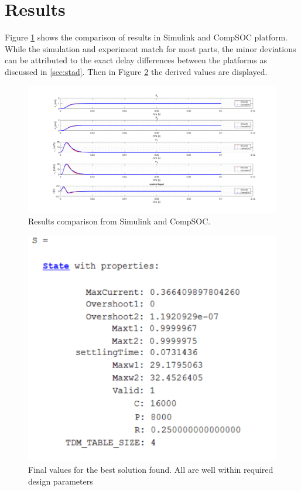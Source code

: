 \section{Results}

Figure \ref{fig:finalresult} shows the comparison of results in Simulink and CompSOC platform. While the simulation and experiment match for most parts, the minor deviations can be attributed to the exact delay differences between the platforms as discussed in \ref{sec:stad}. Then in Figure \ref{fig:Sresult} the derived values are displayed.
\begin{figure}[h]
	\begin{center}
		\includegraphics[width=\linewidth]{img/finalresult}
		\caption{Results comparison from Simulink and CompSOC.}
		\label{fig:finalresult}
	\end{center}
\end{figure}


\begin{figure}[h!]
	\begin{center}
		\includegraphics[width=0.5\linewidth]{img/S}
		\caption{Final values for the best solution found. All are well within required design parameters}
		\label{fig:Sresult}
	\end{center}
\end{figure}